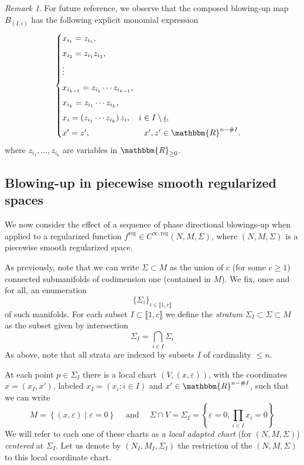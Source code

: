 \documentclass[11pt,psamsfonts]{article}
\newcommand{\tmem}[1]{{\em #1\/}}
\newcommand{\tmop}[1]{\ensuremath{\operatorname{#1}}}
\theoremstyle{definition}
\theoremstyle{remark}
\newtheorem{Remark}[Theorem]{Remark}
\newcommand{\cR}{\ensuremath{\mathbbm{R}}}
\newcommand{\eps}{\varepsilon }
\newcommand{\rg}{\mathrm{reg}}
\begin{document}
\begin{Remark}
  \label{Remark-exprB-nonreg}For future reference, we observe that the composed blowing-up map
  $B_{\left( I, \underline{i} \right)}$ has the following explicit monomial
  expression
\[
\begin{cases}
x_{i_1} = z_{i_1}, \\[4pt]
x_{i_2} = z_{i_1} z_{i_2}, \\[4pt]
\vdots \\[4pt]
x_{i_{k-1}} = z_{i_1} \cdots z_{i_{k-1}}, \\[4pt]
x_{i_k} = z_{i_1} \cdots z_{i_k}, \\[4pt]
x_i = (z_{i_1} \cdots z_{i_k})\, z_i, \quad i \in I \setminus \underline{i}, \\[4pt]
x' = z', \hspace{2.3cm} x', z' \in \cR^{n - \#I}.
\end{cases}
\]
where $z_{i_1},\ldots,z_{i_k}$ are variables in $\cR_{\ge 0}$.
\end{Remark}

\subsection{Blowing-up in piecewise smooth regularized spaces}\label{subsect-local-situation-reg-I}
We now consider the effect of a sequence of phase directional blowings-up when applied to a regularized function $f^\rg \in C^{\infty,\rg}(N,M,\Sigma)$, where $(N, M , \Sigma)$ is a piecewise smooth regularized space. 

As previously, note that we can write $\Sigma \subset M$ as the union of $c$
(for some $c \geqslant 1$) connected submanifolds of codimension one
(contained in $M$). We fix, once and for all, an enumeration
\[ \{ \Sigma_i \}_{i \in \llbracket 1,  c\rrbracket} \]
of such manifolds. For each subset $I \subset \llbracket 1, c \rrbracket$ we
define the {\tmem{stratum}} $\Sigma_I \subset \Sigma \subset M$ as the subset
given by intersection
\[ \Sigma_I = \bigcap_{i \in I} \Sigma_i \]
As above, note that all strata are indexed by subsets $I$ of cardinality
$\leqslant n$.

At each point $p \in \Sigma_I$ there is a local chart $\left( V, \left( x,
\eps \right) \right)$, with the coordinates $x = (x_I, x')$, labeled $x_I =
(x_i : i \in I)$ and $x' \in \cR^{n -\#I}$, such that we can write
\[ M = \left\{ (x,\eps) \mid \eps = 0 \right\} \quad \tmop{and} \quad \Sigma \cap V
   = \Sigma_I  = \left\{ \eps = 0, \prod_{i \in I} x_i = 0 \right\}  \]
We will refer to each one of these charts as {\tmem{a local adapted chart}}
(for $(N, M, \Sigma)$) {\tmem{centered}} at $\Sigma_I$.
Let us denote by $(N_I,M_I,\Sigma_I)$ the restriction of the $(N,M,\Sigma)$ to this local coordinate chart.  
\end{document}
